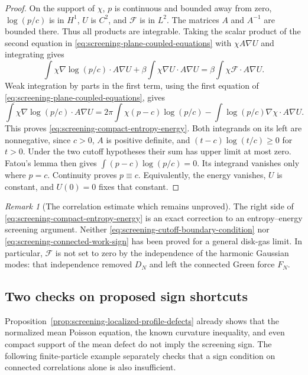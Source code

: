 \documentclass[11pt,a4paper]{article}
\numberwithin{equation}{section}
\theoremstyle{definition}
\theoremstyle{remark}
\newtheorem{remark}[theorem]{Remark}
\begin{document}
\begin{proof}
On the support of $\chi$, $p$ is continuous and bounded away from zero,
$\log(p/c)$ is in $H^1$, $U$ is $C^2$, and $\mathcal F$ is in $L^2$.
The matrices $A$ and $A^{-1}$ are bounded there. Thus all products are
integrable. Taking the scalar product of the second equation in
\eqref{eq:screening-plane-coupled-equations} with $\chi A\nabla U$
and integrating gives
\[
 \int\chi\nabla\log(p/c)\cdot A\nabla U
       +\beta\int\chi\nabla U\cdot A\nabla U
 =\beta\int\chi\mathcal F\cdot A\nabla U.
\]
Weak integration by parts in the first term, using the first equation
of \eqref{eq:screening-plane-coupled-equations}, gives
\[
 \int\chi\nabla\log(p/c)\cdot A\nabla U
 =2\pi\int\chi(p-c)\log(p/c)
       -\int\log(p/c)\nabla\chi\cdot A\nabla U.
\]
This proves \eqref{eq:screening-compact-entropy-energy}.
Both integrands on its left are nonnegative, since $c>0$, $A$ is
positive definite, and $(t-c)\log(t/c)\ge0$ for $t>0$.
Under the two cutoff hypotheses their sum has upper limit at most zero.
Fatou's lemma then gives
$\int(p-c)\log(p/c)=0$. Its integrand vanishes only where $p=c$.
Continuity proves $p\equiv c$. Equivalently, the energy vanishes,
$U$ is constant, and $U(0)=0$ fixes that constant.
\end{proof}

\begin{remark}[The correlation estimate which remains unproved]
The right side of \eqref{eq:screening-compact-entropy-energy} is an
exact correction to an entropy--energy screening argument. Neither
\eqref{eq:screening-cutoff-boundary-condition} nor
\eqref{eq:screening-connected-work-sign} has been proved for a general
disk-gas limit. In particular, $\mathcal F$ is not set to zero by the
independence of the harmonic Gaussian modes: that independence removed
$D_N$ and left the connected Green force $F_N$.
\end{remark}

\subsection{Two checks on proposed sign shortcuts}

Proposition~\ref{prop:screening-localized-profile-defects} already
shows that the normalized mean Poisson equation, the known curvature
inequality, and even compact support of the mean defect do not imply
the screening sign. The following finite-particle example separately
checks that a sign condition on connected correlations alone is also
insufficient.
\end{document}
